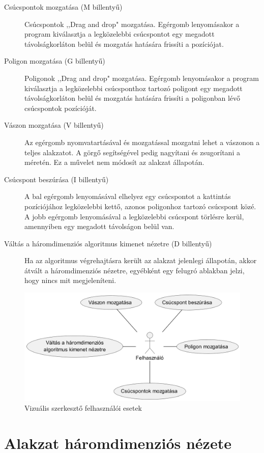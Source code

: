 \begin{description}
    \item[Csúcspontok mozgatása (M billentyű)] Csúcspontok ,,Drag and drop" mozgatása. Egérgomb lenyomásakor a program kiválasztja a legközelebbi csúcspontot egy megadott távolságkorláton belül és mozgatás hatására frissíti a pozíciójat.
    \item[Poligon mozgatása (G billentyű)]  Poligonok ,,Drag and drop" mozgatása. Egérgomb lenyomásakor a program kiválasztja a legközelebbi csúcsponthoz tartozó poligont egy megadott távolságkorláton belül és mozgatás hatására frissíti a poligonban lévő csúcspontok pozícióját.
    \item[Vászon mozgatása (V billentyű)] Az egérgomb nyomvatartásával és mozgatással mozgatni lehet a vászonon a teljes alakzatot. A görgő segítségével pedig nagyítani és zsugorítani a méretén. Ez a művelet nem módosít az alakzat állapotán.
    \item[Csúcspont beszúrása (I billentyű)] A bal egérgomb lenyomásával elhelyez egy csúcspontot a kattintás pozíciójához legközelebbi kettő, azonos poligonhoz tartozó csúcspont közé. A jobb egérgomb lenyomásával a legközelebbi csúcspont törlésre kerül, amennyiben egy megadott távolságon belül van.
    \item[Váltás a háromdimenziós algoritmus kimenet nézetre (D billentyű)] Ha az algoritmus végrehajtásra került az alakzat jelenlegi állapotán, akkor átvált a háromdimenziós nézetre, egyébként egy felugró ablakban jelzi, hogy nincs mit megjeleníteni.
\end{description}

\begin{figure}[H]
    \centering
    \includegraphics[width=.7\linewidth]{images/usecase_visual_editor.png}
    \caption{Vizuális szerkesztő felhasználói esetek}
    \label{fig:usecase_visual_editor-1}
\end{figure}

\section{Alakzat háromdimenziós nézete}


